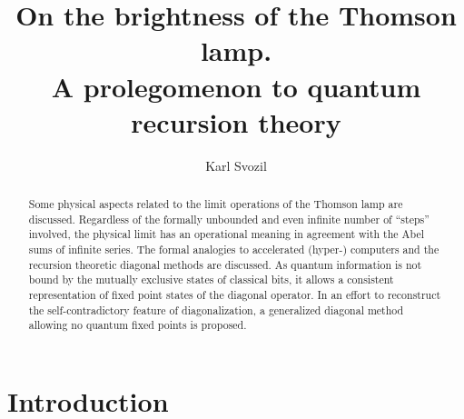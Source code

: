 \documentclass{llncs}
\begin{document}
\title{On the brightness of the Thomson lamp.\\ A prolegomenon to quantum recursion theory}

\author{Karl Svozil}


\maketitle


\begin{abstract}
Some physical aspects related to the limit operations of the Thomson lamp are discussed. Regardless of the formally unbounded and even infinite number of ``steps'' involved, the physical limit has an operational meaning in agreement with the Abel sums of infinite series. The formal analogies to accelerated (hyper-) computers and the recursion theoretic diagonal methods are discussed. As quantum information is not bound by the mutually exclusive states of classical bits, it allows a consistent representation of fixed point states of the diagonal operator. In an effort to reconstruct the self-contradictory feature of diagonalization, a generalized diagonal method allowing no quantum fixed points is proposed.
\end{abstract}

\section{Introduction}
\end{document}
